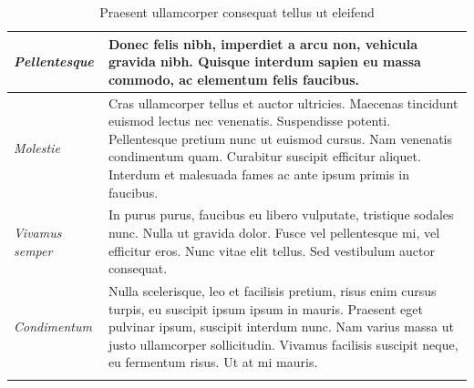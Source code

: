 \begin{center}
\begin{longtable}{ | p{} | p{} | }
		\emph{Pellentesque}
		& Donec felis nibh, imperdiet a arcu non, vehicula gravida nibh. Quisque interdum sapien eu massa commodo, ac elementum felis faucibus.
		\\ \hline
		
		\emph{Molestie}
		& Cras ullamcorper tellus et auctor ultricies. Maecenas tincidunt euismod lectus nec venenatis. Suspendisse potenti. Pellentesque pretium nunc ut euismod cursus. Nam venenatis condimentum quam. Curabitur suscipit efficitur aliquet. Interdum et malesuada fames ac ante ipsum primis in faucibus.
		\\ \hline
		
		\emph{Vivamus semper}
		& In purus purus, faucibus eu libero vulputate, tristique sodales nunc. Nulla ut gravida dolor. Fusce vel pellentesque mi, vel efficitur eros. Nunc vitae elit tellus. Sed vestibulum auctor consequat. 
		\\ \hline
		
		\emph{Condimentum}
		& Nulla scelerisque, leo et facilisis pretium, risus enim cursus turpis, eu suscipit ipsum ipsum in mauris. Praesent eget pulvinar ipsum, suscipit interdum nunc. Nam varius massa ut justo ullamcorper sollicitudin. Vivamus facilisis suscipit neque, eu fermentum risus. Ut at mi mauris.
		\\ \hline
		
		\caption{Praesent ullamcorper consequat tellus ut eleifend}
		\label{tab:example-3}		
	\end{longtable}
\end{center}